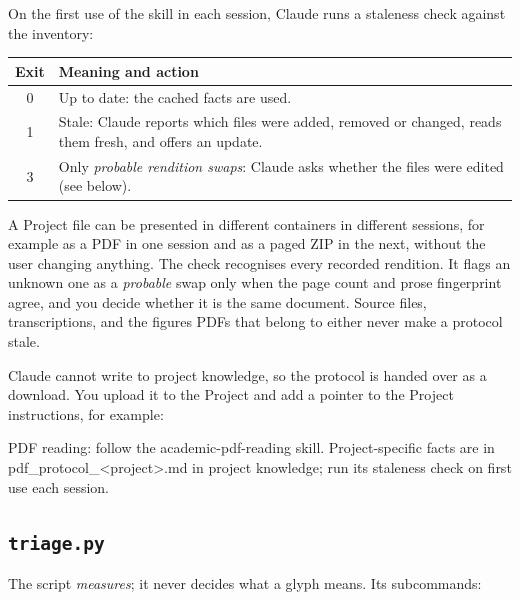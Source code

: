 \documentclass[11pt,a4paper]{article}
\begin{document}
On the first use of the skill in each session, Claude runs a staleness check against the
inventory:

\begin{center}
\small
\begin{tabularx}{0.85\linewidth}{@{}c X@{}}
\toprule
\textbf{Exit} & \textbf{Meaning and action} \\
\midrule
0 & Up to date: the cached facts are used. \\
1 & Stale: Claude reports which files were added, removed or changed, reads them fresh, and offers an update. \\
3 & Only \emph{probable rendition swaps}: Claude asks whether the files were edited (see below). \\
\bottomrule
\end{tabularx}
\end{center}

\noindent A Project file can be presented in different containers in different sessions,
for example as a PDF in one session and as a paged ZIP in the next, without the user changing
anything. The check recognises every recorded rendition. It flags an unknown one as a
\emph{probable} swap only when the page count and prose fingerprint agree, and you decide
whether it is the same document. Source files, transcriptions, and the figures PDFs that belong to either never make a
protocol stale.

Claude cannot write to project knowledge, so the protocol is handed over as a download. You
upload it to the Project and add a pointer to the Project instructions, for example:

\begin{cmd}
PDF reading: follow the academic-pdf-reading skill. Project-specific facts are in
pdf_protocol_<project>.md in project knowledge; run its staleness check on first use
each session.
\end{cmd}

\subsection{\texorpdfstring{\texttt{triage.py}}{triage.py}}
The script \emph{measures}; it never decides what a glyph means. Its subcommands:
\end{document}

